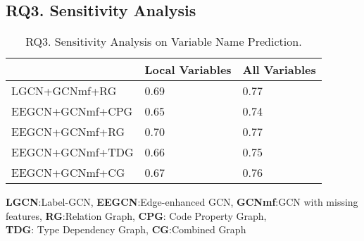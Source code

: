 \subsection{{\bf RQ3. Sensitivity Analysis}}
\label{empirical-rq3}



\begin{table}[t]
	\caption{RQ3. Sensitivity Analysis on Variable Name Prediction.}
	\begin{center}
		\small
		\renewcommand{\arraystretch}{1} 
		\begin{tabular}{p{2.5cm}<{\centering}|p{2cm}<{\centering}|p{2cm}<{\centering}}
			\hline
			                    & Local Variables & All Variables\\
			\hline
			LGCN+GCNmf+RG       & 0.69            & 0.77    \\
			EEGCN+GCNmf+CPG     & 0.65            & 0.74    \\
			EEGCN+GCNmf+RG      & 0.70            & 0.77    \\
			EEGCN+GCNmf+TDG     & 0.66            & 0.75    \\
			EEGCN+GCNmf+CG      & 0.67            & 0.76    \\
			\hline
		\end{tabular}
		\label{RQ3-result-1}
		{\bf LGCN}:Label-GCN, {\bf EEGCN}:Edge-enhanced GCN, {\bf GCNmf}:GCN with missing features, {\bf RG}:Relation Graph, {\bf CPG}: Code Property Graph, \\{\bf TDG}: Type Dependency Graph, {\bf CG}:Combined Graph
	\end{center}
\end{table}

